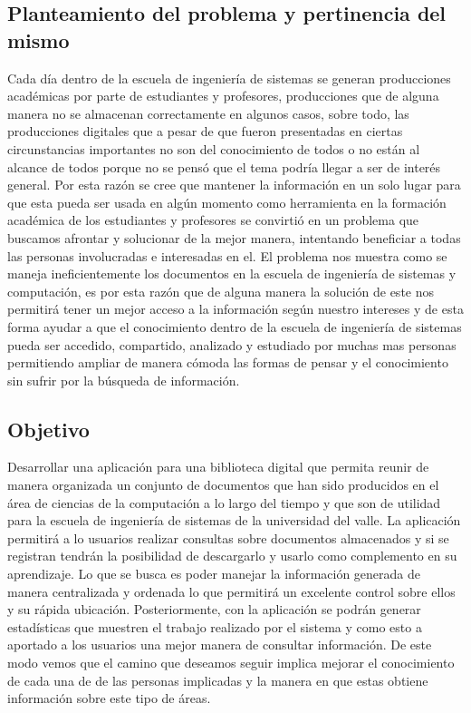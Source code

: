 \documentclass[]{article}
\begin{document}
        \subsection{Planteamiento del problema y pertinencia del mismo}
        Cada día dentro de la escuela de ingeniería de sistemas se generan producciones académicas 			por parte de estudiantes y profesores, producciones que de alguna manera no se almacenan
        correctamente en algunos casos, sobre todo, las producciones digitales que a pesar de que
        fueron presentadas en ciertas circunstancias importantes no son del conocimiento de todos o
        no están al alcance de todos porque no se pensó que el tema podría llegar a ser de interés
        general. Por esta razón se cree que mantener la información en un solo lugar para que esta
        pueda ser usada en algún momento como herramienta en la formación académica de los 
        estudiantes y profesores se convirtió en un problema que buscamos afrontar y solucionar de
        la mejor manera, intentando beneficiar a todas las personas involucradas e interesadas en
        el.
        El problema nos muestra como se maneja ineficientemente los documentos en la escuela de
        ingeniería de sistemas y computación, es por esta razón que de alguna manera la solución de
        este nos permitirá tener un mejor acceso a la información según nuestro intereses y de esta
        forma ayudar a que el conocimiento dentro de la escuela de ingeniería de sistemas pueda ser
        accedido, compartido, analizado y estudiado por muchas mas personas permitiendo ampliar de
        manera cómoda las formas de pensar y el conocimiento sin sufrir por la búsqueda de 
        información.
        
        \subsection{Objetivo}
        Desarrollar una aplicación para una biblioteca digital que permita reunir de manera
        organizada un conjunto de documentos que han sido producidos en el área de ciencias de la
        computación a lo largo del tiempo y que son de utilidad para la escuela de ingeniería de
        sistemas de la universidad del valle. La aplicación permitirá a lo usuarios realizar
        consultas sobre documentos almacenados y si se registran tendrán la posibilidad de
        descargarlo y usarlo como complemento en su aprendizaje. Lo que se busca es poder manejar
        la información generada de manera centralizada y ordenada lo que permitirá un excelente
        control sobre ellos y su rápida ubicación. Posteriormente, con la aplicación se podrán
        generar estadísticas que muestren el trabajo realizado por el sistema y como esto a
        aportado a los usuarios una mejor manera de consultar información.
        De este modo vemos que el camino que deseamos seguir implica mejorar el                      
        conocimiento de cada una de de las personas implicadas y la manera en que estas               
        obtiene información sobre este tipo de áreas.        
        
\end{document}
